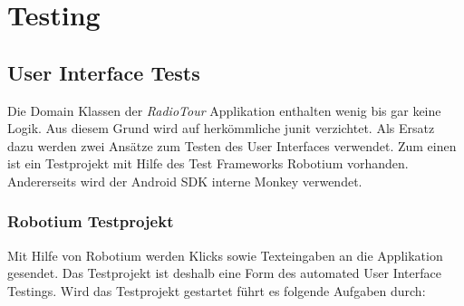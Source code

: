 \chapter{Testing}

\section{User Interface Tests}
Die Domain Klassen der \textit{RadioTour} Applikation enthalten wenig bis gar keine Logik. Aus diesem Grund wird auf herkömmliche \gls{junit} verzichtet. Als Ersatz dazu werden zwei Ansätze zum Testen des User Interfaces verwendet. Zum einen ist ein Testprojekt mit Hilfe des Test Frameworks Robotium vorhanden. Andererseits wird der Android SDK interne Monkey verwendet.

\subsection{Robotium Testprojekt}
 Mit Hilfe von Robotium werden Klicks sowie Texteingaben an die Applikation gesendet. Das Testprojekt ist deshalb eine Form des automated User Interface Testings. Wird das Testprojekt gestartet führt es folgende Aufgaben durch:

